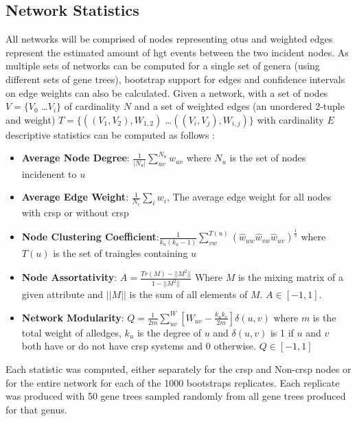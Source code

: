 \subsection{Network Statistics}
All networks will be comprised of nodes representing \ac{otu}s and weighted edges represent the estimated amount of \ac{hgt} events between the two incident nodes.
As multiple sets of networks can be computed for a single set of genera (using different sets of gene trees), bootstrap support for edges and confidence intervals on edge weights can also be calculated.
Given a network, with a set of nodes $V = \{V_0$ \dots $V_i\}$ of cardinality $N$ and a set of weighted edges (an unordered 2-tuple and weight) $T = \{((V_1,V_2),W_{1,2})$ \dots $((V_i,V_j),W_{i,j})\}$ with cardinality $E$ descriptive statistics can be computed as follows \citep{netstat}:
    \begin{itemize}
        \item \textbf{Average Node Degree}: $\frac{1}{|N_u|}\sum_{uv}^{N_u} w_{uv}$ where $N_u$ is the set of nodes incidenent to $u$
        \item \textbf{Average Edge Weight}: $\frac{1}{N_c}\sum_i w_i$, The average edge weight for all nodes with \ac{crsp} or without \ac{crsp}
        \item \textbf{Node Clustering Coefficient}:$\frac{1}{k_u(k_u-1)} \sum_{vw}^{T(u)} (\hat{w}_{uw} \hat{w}_{vw} \hat{w}_{uv})^{\frac{1}{3}}$ where $T(u)$ is the set of traingles containing $u$ \citep{clustering}
        \item \textbf{Node Assortativity}: $A = \frac{Tr(M)-||M^2||}{1-||M^2||}$ Where $M$ is the mixing matrix of a given attribute and $||M||$ is the sum of all elements of $M$. $A \in [-1,1]$.\citep{newmanmix}
        \item \textbf{Network Modularity}: $Q=\frac{1}{2m}\sum_{uv}^W [W_{uv} - \frac{k_u k_v}{2m}]\delta(u,v)$ where $m$ is the total weight of alledges, $k_u$ is the degree of $u$ and $\delta(u,v)$ is 1 if $u$ and $v$ both have or do not have \ac{crsp} systems and 0 otherwise. $Q \in [-1,1]$ \citep{modularity}
    \end{itemize}
Each statistic was computed, either separately for the \ac{crsp} and Non-\ac{crsp} nodes or for the entire network for each of the 1000 bootstraps replicates.
Each replicate was produced with 50 gene trees sampled randomly from all gene trees produced for that genus.

